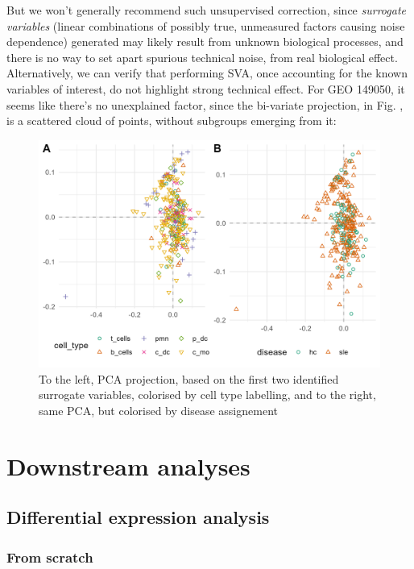 But we won't generally recommend such unsupervised correction, since \emph{surrogate variables} (linear combinations of possibly true, unmeasured factors causing noise dependence) generated may likely result from unknown biological processes, and there is no way to set apart spurious technical noise, from real biological effect. Alternatively, we can verify that performing SVA, once accounting for the known variables of interest, do not highlight strong technical effect. For GEO 149050, it seems like there's no unexplained factor, since the bi-variate projection, in Fig. , is a scattered cloud of points, without subgroups emerging from it:

\begin{figure}

{\centering \includegraphics[width=0.8\linewidth]{figures/sva_unsupervised_pca} 

}

\caption{To the left, PCA projection, based on the first two identified surrogate variables, colorised by cell type labelling, and to the right, same PCA, but colorised by disease assignement}\label{fig:sva-eval}
\end{figure}


\section{Downstream analyses} 
\label{sec:downstream-analyses}


\subsection{Differential expression analysis} 
\label{differential-expression-analysis}


\subsubsection{From scratch} 
\label{from-scratch}

